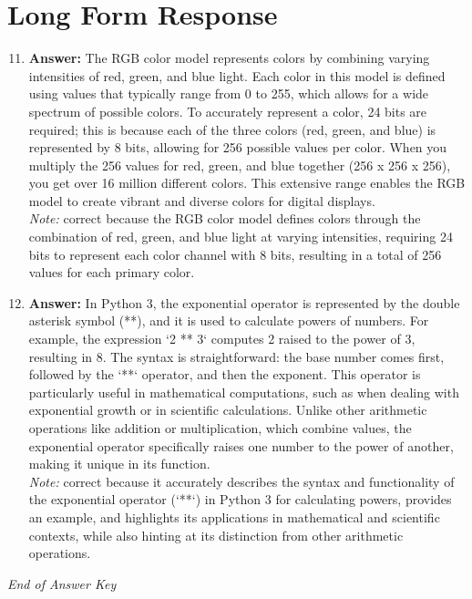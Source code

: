 \documentclass[12pt]{article}
\begin{document}
\section*{Long Form Response}
\begin{enumerate}[label=\arabic*.]
\setcounter{enumi}{10}
\item \textbf{Answer:} The RGB color model represents colors by combining varying intensities of red, green, and blue light. Each color in this model is defined using values that typically range from 0 to 255, which allows for a wide spectrum of possible colors. To accurately represent a color, 24 bits are required; this is because each of the three colors (red, green, and blue) is represented by 8 bits, allowing for 256 possible values per color. When you multiply the 256 values for red, green, and blue together (256 x 256 x 256), you get over 16 million different colors. This extensive range enables the RGB model to create vibrant and diverse colors for digital displays.
\\ \textit{Note:} correct because the RGB color model defines colors through the combination of red, green, and blue light at varying intensities, requiring 24 bits to represent each color channel with 8 bits, resulting in a total of 256 values for each primary color.
\item \textbf{Answer:} In Python 3, the exponential operator is represented by the double asterisk symbol (**), and it is used to calculate powers of numbers. For example, the expression `2 ** 3` computes 2 raised to the power of 3, resulting in 8. The syntax is straightforward: the base number comes first, followed by the `**` operator, and then the exponent. This operator is particularly useful in mathematical computations, such as when dealing with exponential growth or in scientific calculations. Unlike other arithmetic operations like addition or multiplication, which combine values, the exponential operator specifically raises one number to the power of another, making it unique in its function.
\\ \textit{Note:} correct because it accurately describes the syntax and functionality of the exponential operator (`**`) in Python 3 for calculating powers, provides an example, and highlights its applications in mathematical and scientific contexts, while also hinting at its distinction from other arithmetic operations.
\end{enumerate}

\vfill
\noindent\textit{End of Answer Key}
\end{document}
